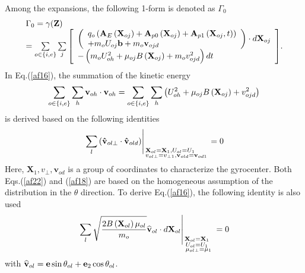 \documentclass[12pt]{iopart}
\begin{document}
Among the expansions, the following 1-form is denoted as $\Gamma_0$
\begin{equation}\label{af16}
\begin{array}{*{20}{l}}
{{\Gamma _0} = \gamma ({\bf{Z}})}\\
{ = \sum\limits_{o \in \{ i,e\} } {\sum\limits_j {\left[ {\begin{array}{*{20}{l}}
{\left( \begin{array}{l}
{q_o}\left( {{{\bf{A}}_E}\left( {{{\bf{X}}_{oj}}} \right) + {{\bf{A}}_{p0}}\left( {{{\bf{X}}_{oj}}} \right) + {{\bf{A}}_{p1}}\left( {{{\bf{X}}_{oj}},t} \right)} \right)\\
 + {m_o}{U_{oj}}{\bf{b}} + {m_o}{{\bf{v}}_{ojd}}
\end{array} \right)\cdot d{{\bf{X}}_{oj}}}\\
{ - \left( {m_o}{U_{oh}^2 + {\mu _{oj}}B\left( {{{\bf{X}}_{oj}}} \right) + {m_o}v_{ojd}^2} \right)dt}
\end{array}} \right]} } .}
\end{array}
\end{equation}
In Eq.(\ref{af16}), the summation of the kinetic energy
\begin{equation}\label{af22}
\sum\limits_{o \in \{ i,e\} } {\sum\limits_h {{{\bf{v}}_{oh}}\cdot{{\bf{v}}_{oh}}} }  = \sum\limits_{o \in \{ i,e\} } {\sum\limits_h {\left( {U_{oh}^2 + {\mu _{oj}}B\left( {{{\bf{X}}_{oj}}} \right) + v_{ojd}^2} \right)} }
\end{equation}
is derived based on the following identities
\begin{equation}\label{af18}
{\left. {\sum\limits_l {\left( {{{{\bf{\hat v}}}_{ol \bot }}\cdot{{{\bf{\hat v}}}_{old}}} \right)} } \right|_{\scriptstyle{{\bf{X}}_{ol}} = {{\bf{X}}_1},{U_{ol}} = {U_1}\hfill\atop
\scriptstyle{v_{ol \bot }} = {v_{ \bot 1}},{{\bf{v}}_{old}} = {{\bf{v}}_{od1}}\hfill}} = 0
\end{equation}
Here, $\mathbf{X}_1,v_\perp,\mathbf{v}_{od}$ is a group of coordinates to characterize the gyrocenter.
Both Eqs.(\ref{af22}) and (\ref{af18}) are based on the homogeneous assumption of the distribution in the $\theta$ direction. To derive Eq.(\ref{af16}), the following identity is also used
\begin{equation}\label{af21}
{\left. {\sum\limits_l {\sqrt {\frac{{2B\left( {{{\bf{X}}_{ol}}} \right){\mu _{ol}}}}{{{m_o}}}} } {{\widehat {\bf{v}}}_{ol}}\cdot d{{\bf{X}}_{ol}}} \right|_{\scriptstyle{{\bf{X}}_{ol}} = {{\bf{X}}_1}\hfill\atop
{\scriptstyle{U_{ol}} = {U_1}\hfill\atop
\scriptstyle{\mu _{ol \bot }} = {\mu _1}\hfill}}} = 0
\end{equation}
with ${\widehat {\bf{v}}_{ol}} = {\bf{e}}\sin {\theta _{ol}} + {{\bf{e}}_2}\cos {\theta _{ol}}$.
\end{document}

